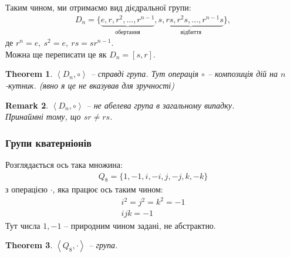 \documentclass[a4paper, 10pt]{article}
\makeatletter
\theoremstyle{theoremdd}
\newtheorem{theorem}{Theorem}[subsection]
\theoremstyle{theoremdd}
\theoremstyle{theoremdd}
\theoremstyle{theoremdd}
\theoremstyle{theoremdd}
\theoremstyle{theoremdd}
\theoremstyle{theoremdd}
\theoremstyle{theoremdd}
\theoremstyle{theoremdd}
\theoremstyle{theoremdd}
\theoremstyle{theoremdd}
\newtheorem{remark}[theorem]{Remark}
\theoremstyle{theoremdd}
\theoremstyle{theoremdd}
\theoremstyle{theoremdd}
\theoremstyle{theoremdd}
\renewenvironment{proof}[1][Proof.\\]{\par
\pushQED{\hfill \qed}%
\normalfont \topsep6\p@\@plus6\p@\relax
\trivlist
\item\relax
{\bfseries
#1\@addpunct{.}}\hspace\labelsep\ignorespaces
}{%
\popQED\endtrivlist\@endpefalse
}
\makeatother
\begin{document}
Таким чином, ми отримаємо вид дієдральної групи:
\begin{align*}
D_n = \{ \underbrace{e,r,r^2,\dots,r^{n-1}}_{\text{обертання}}, \underbrace{s,rs,r^2s,\dots,r^{n-1}s}_{\text{відбиття}} \},
\end{align*}
де $r^n = e,\ s^2 = e,\ rs = sr^{n-1}$.\\
Можна ще переписати це як $D_n = [s,r]$.

\begin{theorem}
$\left< D_n, \circ \right>$ -- справді група. Тут операція $\circ$ -- композиція дій на $n$-кутник. (явно я це не вказував для зручності)
\end{theorem}

\iffalse
\begin{proof}
Замкненість випливає з виразів $r^n = e, s^2 = e, r^ms = sr^{n-m}$. В останньому виразі ми користуватись властивістю асоціативності. І маємо на це права, бо композиція відображень завжди асоціативна.\\
Нейтральний елемент тут $e$ - нічого не робить з $n$-кутником.\\
Оборотні елементи для $r^k$ маємо $(r^{k})^{-1} = r^{n-k}$; для $r^k s$ маємо $(r^k s)^{-1} = s r^{-k} = s(r^k)^{-1}$.
\end{proof}
\fi

\begin{remark}
$\left< D_n, \circ \right>$ -- не абелева група в загальному випадку.\\
Принаймні тому, що $sr \neq rs$.
\end{remark}

\subsubsection{Групи кватерніонів}
Розглядається ось така множина:
\begin{align*}
Q_8 = \{1,-1,i,-i,j,-j,k,-k\}
\end{align*}
з операцією $\cdot$, яка працює ось таким чином:
\begin{align*}
i^2 = j^2 = k^2 = -1 \\
ijk = -1
\end{align*}
Тут числа $1,-1$ -- природним чином задані, не абстрактно.

\begin{theorem}
$\left<Q_8, \cdot \right>$ -- група.
\end{theorem}
\end{document}
